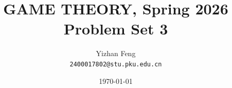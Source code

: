 \title{\textbf{GAME THEORY, Spring 2026} \\[0.5em]
    \Large Problem Set 3}
\author{Yizhan Feng \\ 
    \normalsize{\texttt{2400017802@stu.pku.edu.cn}}}
\date{\today}